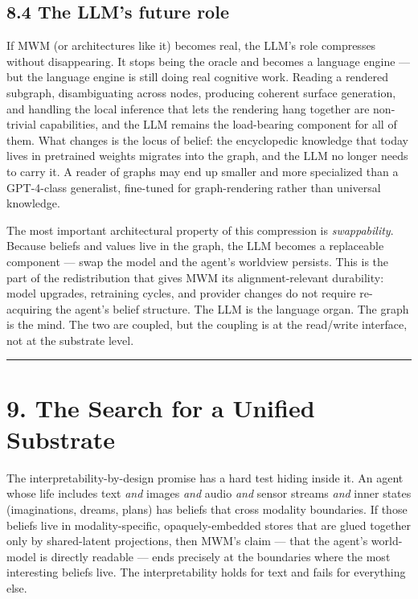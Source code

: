 \documentclass[12pt]{article}
\begin{document}
\subsection{8.4 The LLM's future role}\label{the-llms-future-role}

If MWM (or architectures like it) becomes real, the LLM's role compresses without disappearing. It stops being the oracle and becomes a language engine --- but the language engine is still doing real cognitive work. Reading a rendered subgraph, disambiguating across nodes, producing coherent surface generation, and handling the local inference that lets the rendering hang together are non-trivial capabilities, and the LLM remains the load-bearing component for all of them. What changes is the locus of belief: the encyclopedic knowledge that today lives in pretrained weights migrates into the graph, and the LLM no longer needs to carry it. A reader of graphs may end up smaller and more specialized than a GPT-4-class generalist, fine-tuned for graph-rendering rather than universal knowledge.

The most important architectural property of this compression is \emph{swappability}. Because beliefs and values live in the graph, the LLM becomes a replaceable component --- swap the model and the agent's worldview persists. This is the part of the redistribution that gives MWM its alignment-relevant durability: model upgrades, retraining cycles, and provider changes do not require re-acquiring the agent's belief structure. The LLM is the language organ. The graph is the mind. The two are coupled, but the coupling is at the read/write interface, not at the substrate level.

\begin{center}\rule{0.5\linewidth}{0.5pt}\end{center}

\section{9. The Search for a Unified Substrate}\label{the-search-for-a-unified-substrate}

The interpretability-by-design promise has a hard test hiding inside it. An agent whose life includes text \emph{and} images \emph{and} audio \emph{and} sensor streams \emph{and} inner states (imaginations, dreams, plans) has beliefs that cross modality boundaries. If those beliefs live in modality-specific, opaquely-embedded stores that are glued together only by shared-latent projections, then MWM's claim --- that the agent's world-model is directly readable --- ends precisely at the boundaries where the most interesting beliefs live. The interpretability holds for text and fails for everything else.
\end{document}
